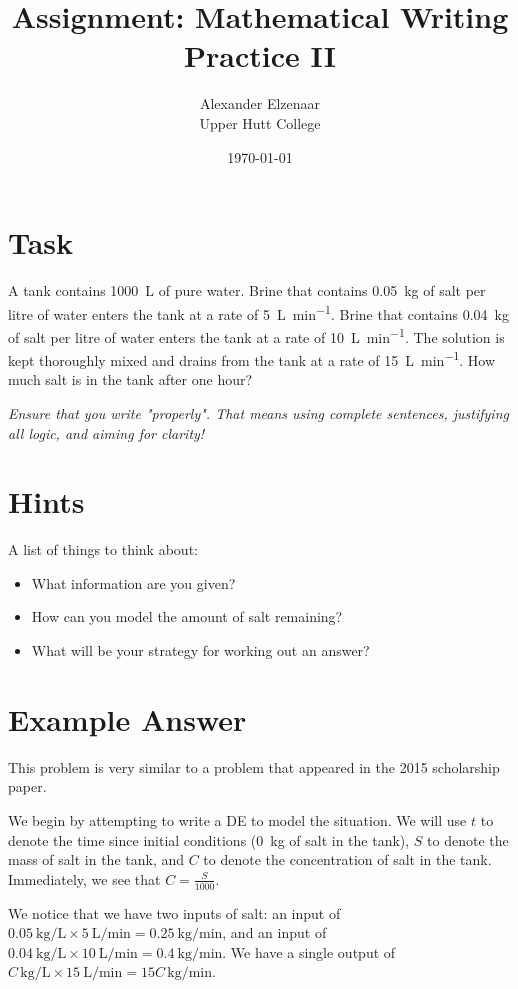 \documentclass[a4paper]{article}
\author{Alexander Elzenaar\\Upper Hutt College}
\date{\today}
\title{Assignment: Mathematical Writing Practice II}
\begin{document}
\maketitle

\section{Task}
A tank contains \SI{1000}{\liter} of pure water. Brine that contains \SI{0.05}{\kilo\gram} of
salt per litre of water enters the tank at a rate of \SI{5}{\liter\per\minute}. Brine that contains
\SI{0.04}{\kilo\gram} of salt per litre of water enters the tank at a rate of \SI{10}{\liter\per\minute}.
The solution is kept thoroughly mixed and drains from the tank at a rate of \SI{15}{\liter\per\minute}.
How much salt is in the tank after one hour?

\textit{Ensure that you write "properly". That means using complete sentences, justifying
all logic, and aiming for clarity!}

\section{Hints}
A list of things to think about:
\begin{itemize}
  \item What information are you given?
  \item How can you model the amount of salt remaining?
  \item What will be your strategy for working out an answer?
\end{itemize}

\newpage
\section{Example Answer}
This problem is very similar to a problem that appeared in the 2015 scholarship paper.

We begin by attempting to write a DE to model the situation. We will use $ t $ to denote
the time since initial conditions (\SI{0}{\kilo\gram} of salt in the tank), $ S $ to denote
the mass of salt in the tank, and $ C $ to denote the concentration of salt in the tank.
Immediately, we see that $ C = \frac{S}{1000} $.

We notice that we have two inputs of salt: an input of $ \SI{0.05}{\kilo\gram\per\liter} \times \SI{5}{\liter\per\minute} = \SI{0.25}{\kilo\gram\per\minute} $,
and an input of $ \SI{0.04}{\kilo\gram\per\liter} \times \SI{10}{\liter\per\minute} = \SI{0.4}{\kilo\gram\per\minute} $. We have a single output of
$ C\,\si{\kilo\gram\per\liter} \times \SI{15}{\liter\per\minute} = 15C\,\si{\kilo\gram\per\minute} $.
\end{document}
